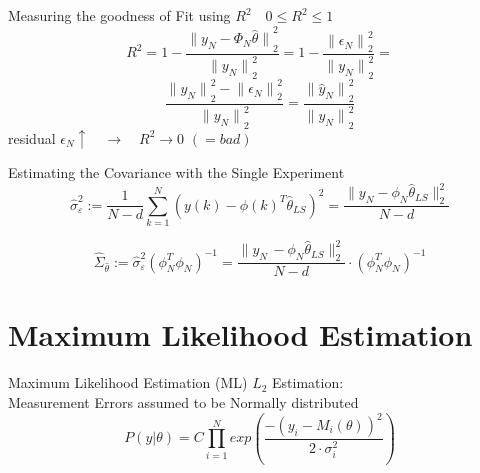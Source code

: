 Measuring the goodness of Fit using \({R}^{2} \quad 0\le {R}^{2} \le1\) 
\begin{equation*}
{ R }^{ 2 }=1-\frac { { \parallel { y }_{ N }-{ \Phi  }_{ N }\hat { \theta  } \parallel  }_{ 2 }^{ 2 } }{ { \parallel { y }_{ N }\parallel  }_{ 2 }^{ 2 } } =1-\frac { { \parallel { \epsilon  }_{ N }\parallel  }_{ 2 }^{ 2 } }{ { \parallel { y }_{ N }\parallel  }_{ 2 }^{ 2 } } =
\end{equation*}
\begin{equation*}
\frac { { \parallel { y }_{ N }\parallel  }_{ 2 }^{ 2 }-{ \parallel { \epsilon  }_{ N }\parallel  }_{ 2 }^{ 2 } }{ { \parallel { y }_{ N }\parallel  }_{ 2 }^{ 2 } } =\frac { { \parallel { \hat { y  }  }_{ N }\parallel  }_{ 2 }^{ 2 } }{ { \parallel { y }_{ N }\parallel  }_{ 2 }^{ 2 } } 
\end{equation*}
residual $ \epsilon_{N} \uparrow \quad \rightarrow \quad R^{2} \rightarrow 0 \,\,(= bad)$





Estimating the Covariance with the Single Experiment
\begin{equation*}
\hat { \sigma  } _{ \varepsilon  }^{ 2 } := \frac { 1 }{ N-d } \sum _{ k=1 }^{ N }{ (y(k)-\phi (k)^{ T }\hat { \theta  } _{ LS })^{ 2 } }  = \frac { \parallel y_{ N }-\phi _{ N }\hat { \theta  } _{ LS }{ \parallel  }_{ 2 }^{ 2 } }{ N-d } 
\end{equation*}

\begin{equation*}
\hat { \Sigma  } _{ \hat { \theta  }  } := \hat { \sigma  } ^{ 2 }_{ \varepsilon  } (\phi ^{ T }_{ N } \phi _{ N })^{ -1 } = \frac { \parallel y_{ N }\, -\phi _{ N }\hat { \theta  } _{ LS }{ \parallel  }_{ 2 }^{ 2 } }{ N-d } \cdot (\phi ^{ T }_{ N } \phi _{ N })^{ -1 }
\end{equation*}



\newpage
\section*{Maximum Likelihood Estimation}
Maximum Likelihood Estimation (ML) \({L}_{2}\) Estimation:\\
Measurement Errors assumed to be Normally distributed
\begin{equation*}
{ P(y|\theta ) }=C\prod _{ i=1 }^{ N }{ exp(\frac { -(y_{ i }-M_{ i }(\theta ))^{ 2 } }{ 2\cdot \sigma _{ i }^{ 2 } } )} 
\end{equation*}

